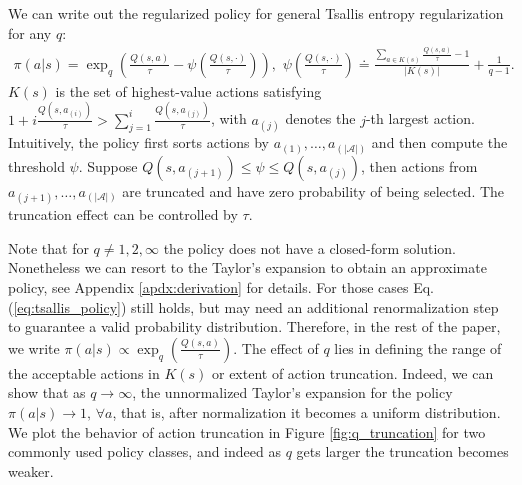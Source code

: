\documentclass{article}
\newcommand{\AdaBracket}[1]{\left(#1\right)}
\newcommand{\eq}[1]{Eq.\,(#1)}
\begin{document}
We can write out the regularized policy for general Tsallis entropy regularization for any $q$\footnotemark{}:
\begin{align}
    \pi(a|s) = \exp_q \AdaBracket{\frac{Q(s,a)}{\tau } - {\psi}\AdaBracket{\frac{Q(s, \cdot)}{\tau }}}, \,\,
    {\psi}\AdaBracket{\frac{Q(s,\cdot)}{\tau}} \doteq \frac{\sum_{a\in K(s)} \frac{Q(s,a)}{\tau} - 1 }{|K{(s)}|} + \frac{1}{q-1}.
    \label{eq:tsallis_policy}
\end{align}
  $K(s)$ is the set of highest-value actions satisfying $1 \!+\! i\frac{Q(s,a_{(i)})}{\tau} \!>\! \sum_{j=1}^{i}\frac{Q(s,a_{(j)})}{\tau}$, with $a_{(j)}$ denotes the $j$-th largest action.
  Intuitively, the policy first sorts actions by $a_{(1)}, \dots, a_{(|\mathcal{A}|)}$ and then compute the threshold $\psi$.
  Suppose $Q(s, a_{(j+1)}) \leq \psi \leq Q(s, a_{(j)})$, then actions from $a_{(j+1)}, \dots, a_{(|\mathcal{A}|)}$ are truncated and have zero probability of being selected.
  The truncation effect can be controlled by $\tau$.
  
  Note that for $q\neq 1,2,\infty$ the policy does not have a closed-form solution. 
  Nonetheless we can resort to the Taylor's expansion to obtain an approximate policy, see Appendix \ref{apdx:derivation} for details. 
  For those cases \eq{\ref{eq:tsallis_policy}} still holds, but may need an additional renormalization step to guarantee a valid probability distribution. 
  Therefore, in the rest of the paper, we write $\pi(a|s) \propto \exp_q\AdaBracket{\frac{Q(s,a)}{\tau}}$.
  The effect of $q$ lies in defining the range of the acceptable actions in $K(s)$ or extent of action truncation. 
  Indeed, we can show that as $q \rightarrow \infty$, the unnormalized Taylor's expansion for the policy $\pi(a|s) \rightarrow 1, \, \forall a$, that is, after normalization it becomes a uniform distribution.
We plot the behavior of action truncation in Figure \ref{fig:q_truncation} for two commonly used policy classes, and indeed as $q$ gets larger the truncation becomes weaker.
\end{document}
